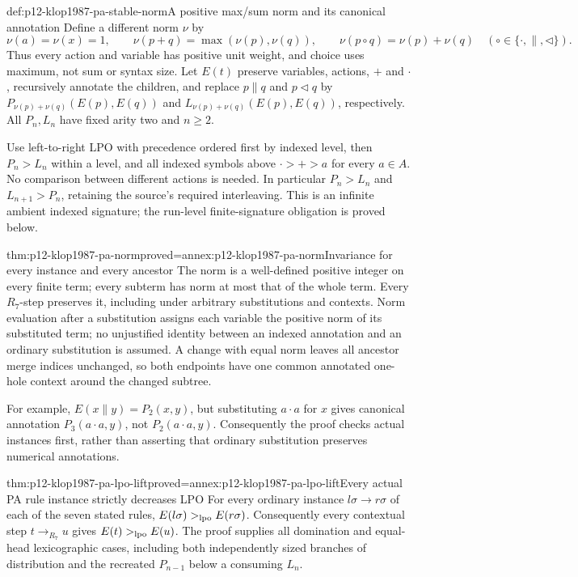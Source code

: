 \begin{hbdefinition}{def:p12-klop1987-pa-stable-norm}{A positive max/sum norm and its canonical annotation}
Define a different norm \(\nu\) by
\[
 \nu(a)=\nu(x)=1,\qquad
 \nu(p+q)=\max(\nu(p),\nu(q)),\qquad
 \nu(p\circ q)=\nu(p)+\nu(q)
 \quad(\circ\in\{\cdot,\parallel,\lhd\}).
\]
Thus every action and variable has positive unit weight, and choice
uses maximum, not sum or syntax size. Let \(E(t)\) preserve variables,
actions, \(+\) and \(\cdot\), recursively annotate the children,
and replace \(p\parallel q\) and \(p\lhd q\) by
\(P_{\nu(p)+\nu(q)}(E(p),E(q))\) and
\(L_{\nu(p)+\nu(q)}(E(p),E(q))\), respectively.
All \(P_n,L_n\) have fixed arity two and \(n\geq2\).

Use left-to-right LPO with precedence ordered first by indexed level,
then \(P_n>L_n\) within a level, and all indexed symbols above
\(\cdot>+>a\) for every \(a\in A\). No comparison between
different actions is needed. In particular
\(P_n>L_n\) and \(L_{n+1}>P_n\), retaining the source's
required interleaving. This is an infinite ambient indexed signature;
the run-level finite-signature obligation is proved below.
\end{hbdefinition}

\begin{hblemma}{thm:p12-klop1987-pa-norm}{proved=annex:p12-klop1987-pa-norm}{Invariance for every instance and every ancestor}
The norm is a well-defined positive integer on every finite term;
every subterm has norm at most that of the whole term. Every
\(R_7\)-step preserves it, including under arbitrary substitutions
and contexts. Norm evaluation after a substitution assigns each
variable the positive norm of its substituted term; no unjustified
identity between an indexed annotation and an ordinary substitution
is assumed. A change with equal norm leaves all ancestor merge
indices unchanged, so both endpoints have one common annotated
one-hole context around the changed subtree.
\end{hblemma}

For example, \(E(x\parallel y)=P_2(x,y)\), but substituting
\(a\cdot a\) for \(x\) gives canonical annotation
\(P_3(a\cdot a,y)\), not \(P_2(a\cdot a,y)\).
Consequently the proof checks actual instances first, rather than
asserting that ordinary substitution preserves numerical annotations.

\begin{hblemma}{thm:p12-klop1987-pa-lpo-lift}{proved=annex:p12-klop1987-pa-lpo-lift}{Every actual PA rule instance strictly decreases LPO}
For every ordinary instance \(l\sigma\to r\sigma\) of each
of the seven stated rules,
\(E(l\sigma)>_{\rm lpo}E(r\sigma)\). Consequently every
contextual step \(t\to_{R_7}u\) gives
\(E(t)>_{\rm lpo}E(u)\). The proof supplies all domination
and equal-head lexicographic cases, including both independently
sized branches of distribution and the recreated
\(P_{n-1}\) below a consuming \(L_n\).
\end{hblemma}

